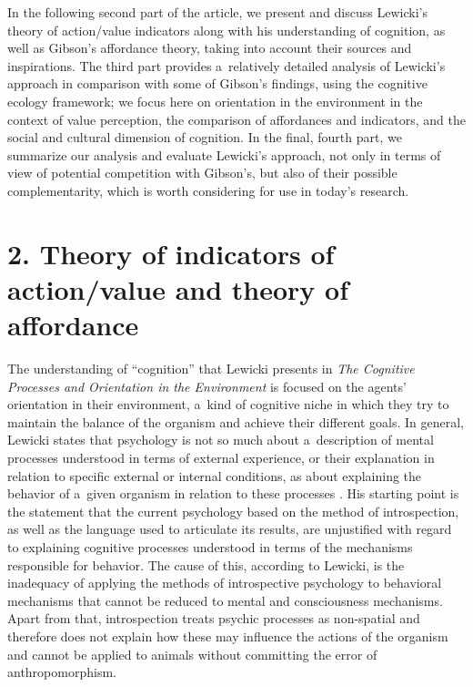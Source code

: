 In the following second part of the article, we present and discuss Lewicki's theory of action/value indicators along with his understanding of cognition, as well as Gibson's affordance theory, taking into account their sources and inspirations. The third part provides a~relatively detailed analysis of Lewicki's approach in comparison with some of Gibson's findings, using the cognitive ecology framework; we focus here on orientation in the environment in the context of value perception, the comparison of affordances and indicators, and the social and cultural dimension of cognition. In the final, fourth part, we summarize our analysis and evaluate Lewicki's approach, not only in terms of view of potential competition with Gibson's, but also of their possible complementarity, which is worth considering for use in today's research.



\section*{2. Theory of indicators of action/value and theory of affordance}

The understanding of ``cognition'' that Lewicki presents in \textit{The Cognitive Processes and Orientation in the Environment} 
\parencite*[][]{} %
 is focused on the agents' orientation in their environment, a~kind of cognitive niche in which they try to maintain the balance of the organism and achieve their different goals. In general, Lewicki states that psychology is not so much about a~description of mental processes understood in terms of external experience, or their explanation in relation to specific external or internal conditions, as about explaining the behavior of a~given organism in relation to these processes 
\parencite[][pp.7–18]{lewicki_procesy_1960}. %
 His starting point is the statement that the current psychology based on the method of introspection, as well as the language used to articulate its results, are unjustified with regard to explaining cognitive processes understood in terms of the mechanisms responsible for behavior. The cause of this, according to Lewicki, is the inadequacy of applying the methods of introspective psychology to behavioral mechanisms that cannot be reduced to mental and consciousness mechanisms. Apart from that, introspection treats psychic processes as non-spatial and therefore does not explain how these may influence the actions of the organism and cannot be applied to animals without committing the error of anthropomorphism.



